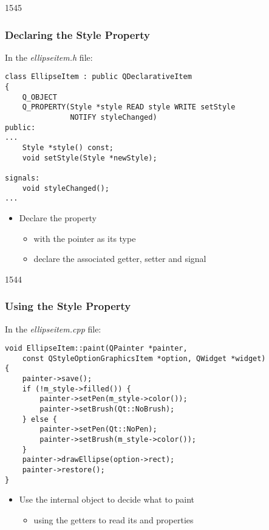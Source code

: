 \begin{slide}[fragile]{1545}\frametitle{Declaring the Style Property}

In the \textit{ellipseitem.h} file:

\vspace*{0.25em}
\begin{lstlisting}
class EllipseItem : public QDeclarativeItem
{
    Q_OBJECT
    Q_PROPERTY(Style *style READ style WRITE setStyle
               NOTIFY styleChanged)
public:
...
    Style *style() const;
    void setStyle(Style *newStyle);

signals:
    void styleChanged();
...
\end{lstlisting}

\begin{itemize}
\item Declare the  property
  \begin{itemize}
  \item with the  pointer as its type
  \item declare the associated getter, setter and signal
  \end{itemize}
\end{itemize}

\end{slide}

\begin{slide}[fragile]{1544}\frametitle{Using the Style Property}

In the \textit{ellipseitem.cpp} file:

\vspace*{0.25em}
\begin{lstlisting}
void EllipseItem::paint(QPainter *painter,
    const QStyleOptionGraphicsItem *option, QWidget *widget)
{
    painter->save();
    if (!m_style->filled()) {
        painter->setPen(m_style->color());
        painter->setBrush(Qt::NoBrush);
    } else {
        painter->setPen(Qt::NoPen);
        painter->setBrush(m_style->color());
    }
    painter->drawEllipse(option->rect);
    painter->restore();
}
\end{lstlisting}

\begin{itemize}
\item Use the internal  object to decide what to paint
  \begin{itemize}
  \item using the getters to read its  and 
        properties
  \end{itemize}
\end{itemize}

\end{slide}

